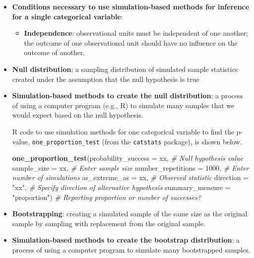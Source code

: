 \documentclass[
]{report}
\newenvironment{Shaded}{\begin{snugshade}}{\end{snugshade}}
\newcommand{\AttributeTok}[1]{\textcolor[rgb]{0.13,0.29,0.53}{#1}}
\newcommand{\CommentTok}[1]{\textcolor[rgb]{0.56,0.35,0.01}{\textit{#1}}}
\newcommand{\DecValTok}[1]{\textcolor[rgb]{0.00,0.00,0.81}{#1}}
\newcommand{\FunctionTok}[1]{\textcolor[rgb]{0.13,0.29,0.53}{\textbf{#1}}}
\newcommand{\NormalTok}[1]{#1}
\newcommand{\StringTok}[1]{\textcolor[rgb]{0.31,0.60,0.02}{#1}}
\providecommand{\tightlist}{%
  \setlength{\itemsep}{0pt}\setlength{\parskip}{0pt}}
\begin{document}
\begin{itemize}
\item
  \textbf{Conditions necessary to use simulation-based methods for inference for a single categorical variable}:

  \begin{itemize}
  \tightlist
  \item
    \textbf{Independence}: observational units must be independent of one another; the outcome of one observational unit should have no influence on the outcome of another.
  \end{itemize}
\item
  \textbf{Null distribution}: a sampling distribution of simulated sample statistics created under the assumption that the null hypothesis is true
\item
  \textbf{Simulation-based methods to create the null distribution}: a process of using a computer program (e.g., R) to simulate many samples that we would expect based on the null hypothesis.

  R code to use simulation methods for one categorical variable to find the p-value, \texttt{one\_proportion\_test} (from the \texttt{catstats} package), is shown below.

\begin{Shaded}
\begin{Highlighting}[]
\FunctionTok{one\_proportion\_test}\NormalTok{(}\AttributeTok{probability\_success =}\NormalTok{ xx, }\CommentTok{\# Null hypothesis value}
      \AttributeTok{sample\_size =}\NormalTok{ xx, }\CommentTok{\# Enter sample size}
      \AttributeTok{number\_repetitions =} \DecValTok{1000}\NormalTok{, }\CommentTok{\# Enter number of simulations}
      \AttributeTok{as\_extreme\_as =}\NormalTok{ xx, }\CommentTok{\# Observed statistic}
      \AttributeTok{direction =} \StringTok{"xx"}\NormalTok{, }\CommentTok{\# Specify direction of alternative hypothesis}
      \AttributeTok{summary\_measure =} \StringTok{"proportion"}\NormalTok{) }\CommentTok{\# Reporting proportion or number of successes?}
\end{Highlighting}
\end{Shaded}
\item
  \textbf{Bootstrapping}: creating a simulated sample of the same size as the original sample by sampling with replacement from the original sample.
\item
  \textbf{Simulation-based methods to create the bootstrap distribution}: a process of using a computer program to simulate many bootstrapped samples.


\end{itemize}
\end{document}
